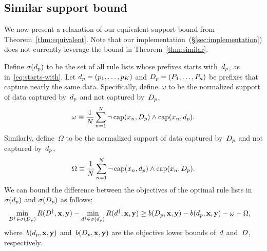 \begin{arxiv}
\subsection{Similar support bound}
\label{sec:similar}

We now present a relaxation of our equivalent support bound
from Theorem~\ref{thm:equivalent}.
%
Note that our implementation~(\S\ref{sec:implementation}) does not
currently leverage the bound in Theorem~\ref{thm:similar}.

\begin{theorem}
\label{thm:similar}
Define $\sigma(d_p)$ to be the set of all rule lists
whose prefixes starts with~$d_p$, as in~\eqref{eq:starts-with}.
%
Let ${d_p = (p_1, \dots, p_K)}$ and
${D_p = (P_1, \dots, P_{\kappa})}$ be prefixes
that capture nearly the same data.
%
Specifically, define~$\omega$ to be the normalized support
of data captured by~$d_p$ and not captured by~$D_p$, \ie
\begin{align}
\omega \equiv \frac{1}{N} \sum_{n=1}^N
  \neg\, \Cap(x_n, \PrefixB)
  \wedge \Cap(x_n, \Prefix). %
\label{eq:omega}
\end{align}
%
Similarly, define~$\Omega$ to be the normalized support
of data captured by~$D_p$ and not captured by~$d_p$, \ie
\begin{align}
\Omega \equiv \frac{1}{N} \sum_{n=1}^N
  \neg\, \Cap(x_n, \Prefix)
  \wedge \Cap(x_n, \PrefixB). %
\label{eq:big-omega}
\end{align}
We can bound the difference between the objectives of the
optimal rule lists in~$\sigma(d_p)$
and $\sigma(D_p)$ as follows:
\begin{align}
\min_{{D}^\dagger \in \sigma(D_p)} R({D}^\dagger, \mathbf{x}, \mathbf{y})
- \min_{{d}^\dagger \in \sigma(d_p)} R({d}^\dagger, \mathbf{x}, \mathbf{y})
&\ge b(D_p, \mathbf{x}, \mathbf{y}) - b(d_p, \mathbf{x}, \mathbf{y}) - \omega - \Omega,
\label{eq:similar}
\end{align}
where~$b(d_p, \mathbf{x}, \mathbf{y})$ and~$b(D_p, \mathbf{x}, \mathbf{y})$ are the
objective lower bounds of~${d}$ and~${D}$, respectively.
\end{theorem}


\end{arxiv}
